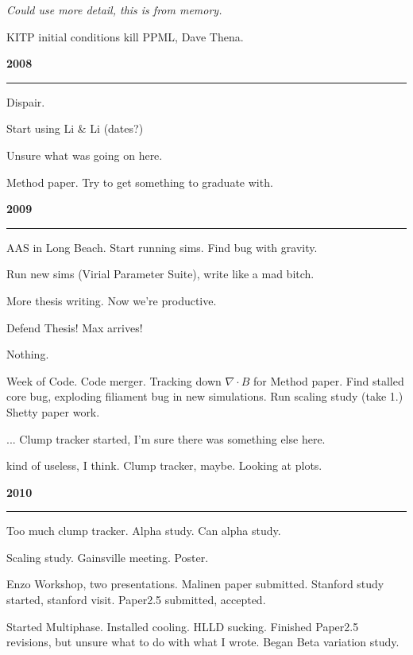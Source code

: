 \documentclass[10pt]{article}
\begin{document}
\emph{Could use more detail, this is from memory.}

 KITP initial conditions kill PPML, Dave Thena.

\begin{center}{\bf 2008}\end{center}

\noindent\rule[3pt]{\textwidth}{.1mm}

 Dispair.  

 Start using Li \& Li (dates?)

 Unsure what was going on here.

 Method paper.  Try to get something to graduate with.

\begin{center}{\bf 2009}\end{center}

\noindent\rule[3pt]{\textwidth}{.1mm}

 AAS in Long Beach.  Start running sims.  Find bug with gravity.

 Run new sims (Virial Parameter Suite), write like a mad bitch.

 More thesis writing.  Now we're productive.

 Defend Thesis!  Max arrives!

 Nothing.

 Week of Code. Code merger. Tracking down $\nabla \cdot B$ for Method paper.  Find
stalled core bug, exploding filiament bug in new simulations.  Run scaling study
(take 1.)  Shetty paper work.

 ... Clump tracker started, I'm sure there was something else here.

 kind of useless, I think.  Clump tracker, maybe.  Looking at plots.

\begin{center}{\bf 2010}\end{center}

\noindent\rule[3pt]{\textwidth}{.1mm}

 Too much clump tracker.  Alpha study.  Can alpha study.

 Scaling study.  Gainsville meeting.  Poster.

 Enzo Workshop, two presentations.  Malinen paper submitted.
Stanford study started, stanford visit.  Paper2.5 submitted, accepted.

  Started Multiphase.  Installed cooling.  HLLD sucking.  Finished
Paper2.5 revisions, but unsure what to do with what I wrote.  Began Beta
variation study.
\end{document}
